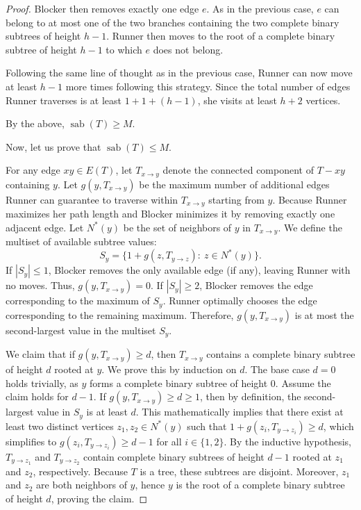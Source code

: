 \documentclass[10pt,a4paper]{amsart}
\DeclareMathOperator{\sab}{\mathrm{sab}}
\begin{document}
\begin{proof}
Blocker then removes exactly one edge $e$. As in the previous case, $e$ can belong to at most one of the two branches containing the two complete binary subtrees of height $h-1$. Runner then moves to the root of a complete binary subtree of height $h-1$ to which $e$ does not belong. 

Following the same line of thought as in the previous case, Runner can now move at least $h-1$ more times following this strategy. Since the total number of edges Runner traverses is at least $1 + 1 + (h-1)$, she visits at least $h + 2$ vertices.

By the above, $\sab(T) \ge M$. 

Now, let us prove that $\sab(T)\le M$. 

For any edge $xy \in E(T)$, let $T_{x \to y}$ denote the connected component of $T - xy$ containing $y$. Let $g(y, T_{x \to y})$ be the maximum number of additional edges Runner can guarantee to traverse within $T_{x \to y}$ starting from $y$. Because Runner maximizes her path length and Blocker minimizes it by removing exactly one adjacent edge. Let $N^*(y)$ be the set of neighbors of $y$ in $T_{x \to y}$. We define the multiset of available subtree values:
$$S_y = \{ 1 + g(z, T_{y \to z}):\ z \in N^*(y) \}.$$
If $|S_y| \le 1$, Blocker removes the only available edge (if any), leaving Runner with no moves. Thus, $g(y, T_{x \to y}) = 0$. 
If $|S_y| \ge 2$, Blocker removes the edge corresponding to the maximum of $S_y$. Runner optimally chooses the edge corresponding to the remaining maximum. Therefore, $g(y, T_{x \to y})$ is at most the second-largest value in the multiset $S_y$.

We claim that if $g(y, T_{x \to y}) \ge d$, then $T_{x \to y}$ contains a complete binary subtree of height $d$ rooted at $y$. We prove this by induction on $d$. The base case $d=0$ holds trivially, as $y$ forms a complete binary subtree of height $0$. Assume the claim holds for $d-1$. If $g(y, T_{x \to y}) \ge d \ge 1$, then by definition, the second-largest value in $S_y$ is at least $d$. This mathematically implies that there exist at least two distinct vertices $z_1, z_2 \in N^*(y)$ such that $1 + g(z_i, T_{y \to z_i}) \ge d$, which simplifies to $g(z_i, T_{y \to z_i}) \ge d-1$ for all $i \in \{1, 2\}$. By the inductive hypothesis, $T_{y \to z_1}$ and $T_{y \to z_2}$ contain complete binary subtrees of height $d-1$ rooted at $z_1$ and $z_2$, respectively. Because $T$ is a tree, these subtrees are disjoint. Moreover, $z_1$ and $z_2$ are both neighbors of $y$, hence $y$ is the root of a complete binary subtree of height $d$, proving the claim.


\end{proof}
\end{document}
